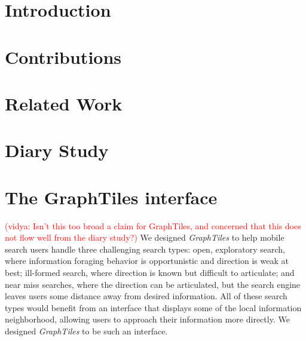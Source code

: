\documentclass{sigchi}
\newcommand{\vidya}[1]{\textcolor{red}{(vidya: #1)}}
\begin{document}









\section{Introduction}



\section{Contributions}



\section{Related Work}



\section{Diary Study}





\section{The GraphTiles interface}
\vidya{Isn't this too broad a claim for GraphTiles, and concerned that this does not flow well from the diary study?}
We designed \textit{GraphTiles} to help mobile search users handle three challenging search types: open, exploratory search, where information foraging behavior is opportunistic and direction is weak at best; ill-formed search, where direction is known but difficult to articulate; and near miss searches, where the direction can be articulated, but the search engine leaves users some distance away from desired information. All of these search types would benefit from an interface that displays some of the local information neighborhood, allowing users to approach their information more directly. 
We designed \textit{GraphTiles} to be such an interface. 
\end{document}
